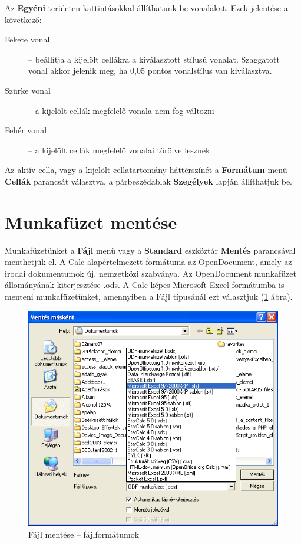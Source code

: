 Az \textbf{Egyéni} területen kattintásokkal állíthatunk be
vonalakat. Ezek jelentése a következő:
\begin{description}
\item [Fekete vonal] -- beállítja a kijelölt cellákra a
kiválasztott stílusú vonalat. Szaggatott vonal akkor jelenik meg,
ha 0,05 pontos vonalstílus van kiválasztva.
\item [Szürke vonal] -- a kijelölt cellák megfelelő vonala
nem fog változni
\item [Fehér vonal] -- a kijelölt cellák megfelelő vonalai
törölve lesznek. 
\end{description}

Az aktív cella, vagy a kijelölt cellatartomány
háttérszínét a \textbf{Formátum} menü \textbf{Cellák}
parancsát választva, a párbeszédablak \textbf{Szegélyek}
lapján állíthatjuk be. 


\section{Munkafüzet mentése}

Munkafüzetünket a \textbf{Fájl} menü vagy a \textbf{Standard}
eszköztár \textbf{Mentés} parancsával menthetjük el. A Calc
alapértelmezett formátuma az OpenDocument, amely az irodai
dokumentumok új, nemzetközi szabványa. Az OpenDocument
munkafüzet állományának kiterjesztése .ods. A Calc képes
Microsoft Excel formátumba is menteni munkafüzetünket, amennyiben
a Fájl típusánál ezt választjuk (\ref{FájlFormátumok} ábra).

\begin{figure}[!h]
\begin{center}
\includegraphics[width=13.79cm]{oocalcv1-img17.png}
\caption{Fájl mentése --  fájlformátumok}\label{FájlFormátumok} 
\end{center}
\end{figure}


